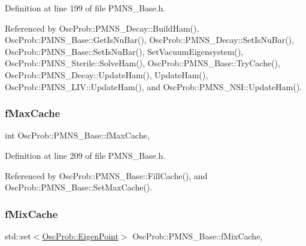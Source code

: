 Definition at line 199 of file P\+M\+N\+S\+\_\+\+Base.\+h.



Referenced by Osc\+Prob\+::\+P\+M\+N\+S\+\_\+\+Decay\+::\+Build\+Ham(), Osc\+Prob\+::\+P\+M\+N\+S\+\_\+\+Base\+::\+Get\+Is\+Nu\+Bar(), Osc\+Prob\+::\+P\+M\+N\+S\+\_\+\+Decay\+::\+Set\+Is\+Nu\+Bar(), Osc\+Prob\+::\+P\+M\+N\+S\+\_\+\+Base\+::\+Set\+Is\+Nu\+Bar(), Set\+Vacuum\+Eigensystem(), Osc\+Prob\+::\+P\+M\+N\+S\+\_\+\+Sterile\+::\+Solve\+Ham(), Osc\+Prob\+::\+P\+M\+N\+S\+\_\+\+Base\+::\+Try\+Cache(), Osc\+Prob\+::\+P\+M\+N\+S\+\_\+\+Decay\+::\+Update\+Ham(), Update\+Ham(), Osc\+Prob\+::\+P\+M\+N\+S\+\_\+\+L\+I\+V\+::\+Update\+Ham(), and Osc\+Prob\+::\+P\+M\+N\+S\+\_\+\+N\+S\+I\+::\+Update\+Ham().

\mbox{\label{classOscProb_1_1PMNS__Base_a74c13356eafec2490d8c3c19759ba7f0}} 
\subsubsection{\texorpdfstring{f\+Max\+Cache}{fMaxCache}}
{\footnotesize\ttfamily int Osc\+Prob\+::\+P\+M\+N\+S\+\_\+\+Base\+::f\+Max\+Cache\hspace{0.3cm}{\ttfamily [protected]}, {\ttfamily [inherited]}}



Definition at line 209 of file P\+M\+N\+S\+\_\+\+Base.\+h.



Referenced by Osc\+Prob\+::\+P\+M\+N\+S\+\_\+\+Base\+::\+Fill\+Cache(), and Osc\+Prob\+::\+P\+M\+N\+S\+\_\+\+Base\+::\+Set\+Max\+Cache().

\mbox{\label{classOscProb_1_1PMNS__Base_a8159424f20197a3a7145fe3bf2c11176}} 
\subsubsection{\texorpdfstring{f\+Mix\+Cache}{fMixCache}}
{\footnotesize\ttfamily std\+::set$<$\hyperlink{structOscProb_1_1EigenPoint}{Osc\+Prob\+::\+Eigen\+Point}$>$ Osc\+Prob\+::\+P\+M\+N\+S\+\_\+\+Base\+::f\+Mix\+Cache\hspace{0.3cm}{\ttfamily [protected]}, {\ttfamily [inherited]}}



